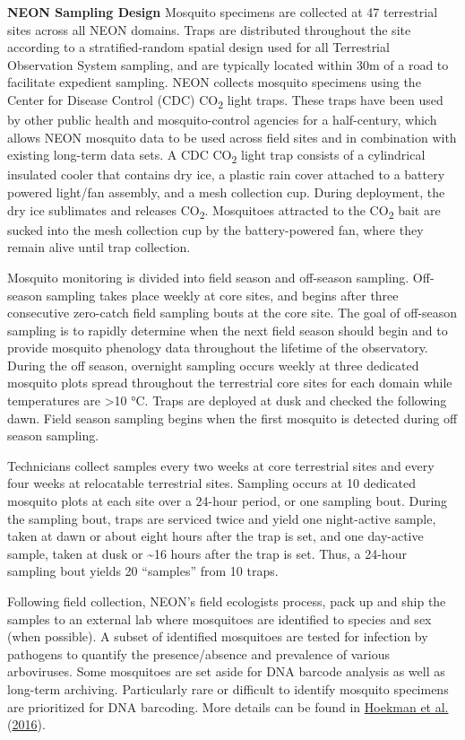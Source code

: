 \documentclass[
  12pt,
]{article}
\begin{document}
\textbf{NEON Sampling Design} Mosquito specimens are collected at 47 terrestrial sites across all NEON domains. Traps are distributed throughout the site according to a stratified-random spatial design used for all Terrestrial Observation System sampling, and are typically located within 30m of a road to facilitate expedient sampling. NEON collects mosquito specimens using the Center for Disease Control (CDC) CO\textsubscript{2} light traps. These traps have been used by other public health and mosquito-control agencies for a half-century, which allows NEON mosquito data to be used across field sites and in combination with existing long-term data sets. A CDC CO\textsubscript{2} light trap consists of a cylindrical insulated cooler that contains dry ice, a plastic rain cover attached to a battery powered light/fan assembly, and a mesh collection cup. During deployment, the dry ice sublimates and releases CO\textsubscript{2}. Mosquitoes attracted to the CO\textsubscript{2} bait are sucked into the mesh collection cup by the battery-powered fan, where they remain alive until trap collection.

Mosquito monitoring is divided into field season and off-season sampling. Off-season sampling takes place weekly at core sites, and begins after three consecutive zero-catch field sampling bouts at the core site. The goal of off-season sampling is to rapidly determine when the next field season should begin and to provide mosquito phenology data throughout the lifetime of the observatory. During the off season, overnight sampling occurs weekly at three dedicated mosquito plots spread throughout the terrestrial core sites for each domain while temperatures are \textgreater10 °C. Traps are deployed at dusk and checked the following dawn. Field season sampling begins when the first mosquito is detected during off season sampling.

Technicians collect samples every two weeks at core terrestrial sites and every four weeks at relocatable terrestrial sites. Sampling occurs at 10 dedicated mosquito plots at each site over a 24-hour period, or one sampling bout. During the sampling bout, traps are serviced twice and yield one night-active sample, taken at dawn or about eight hours after the trap is set, and one day-active sample, taken at dusk or \textasciitilde16 hours after the trap is set. Thus, a 24-hour sampling bout yields 20 ``samples'' from 10 traps.

Following field collection, NEON's field ecologists process, pack up and ship the samples to an external lab where mosquitoes are identified to species and sex (when possible). A subset of identified mosquitoes are tested for infection by pathogens to quantify the presence/absence and prevalence of various arboviruses. Some mosquitoes are set aside for DNA barcode analysis as well as long-term archiving. Particularly rare or difficult to identify mosquito specimens are prioritized for DNA barcoding. More details can be found in \protect\hyperlink{ref-hoekman2016design}{Hoekman et al.} (\protect\hyperlink{ref-hoekman2016design}{2016}).
\end{document}
